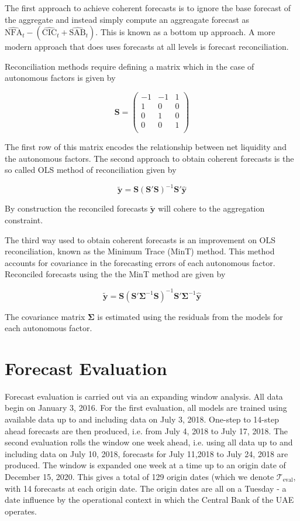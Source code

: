 \documentclass{article}
\begin{document}
The first approach to achieve coherent forecasts is to ignore the base forecast of the aggregate and instead simply compute an aggreagate forecast as 
$\hat{\textrm{NFA}}_t-(\hat{\textrm{CIC}}_t+\hat{\textrm{SAB}}_t)$. This is known as a bottom up approach. A more modern approach that does uses forecasts at all levels is forecast reconciliation.

Reconciliation methods require defining a matrix which in the case of autonomous factors is given by

\[
\mathbf{S}=\begin{pmatrix} -1 & -1 & 1\\
1 & 0 & 0\\
0 & 1 & 0\\
0 & 0 & 1\\
\end{pmatrix}
\]

The first row of this matrix encodes the relationship between net liquidity and the autonomous factors. The second approach to obtain coherent forecasts is the so called OLS method of reconciliation \citep{HynEtAl2011} given by

\[
\tilde{\mathbf{y}}=\mathbf{S}\left(\mathbf{S}'\mathbf{S}\right)^{-1}\mathbf{S}'\hat{\mathbf{y}}
\]

By construction the reconciled forecasts $\tilde{\mathbf{y}}$ will cohere to the aggregation constraint.

The third way used to obtain coherent forecasts is an improvement on OLS reconciliation, known as the Minimum Trace (MinT) method\citep{WicEtAl2019}.  This method accounts for covariance in the forecasting errors of each autonomous factor. Reconciled forecasts using the the MinT method are given by

\[
\tilde{\mathbf{y}}=\mathbf{S}\left(\mathbf{S}'\boldsymbol{\Sigma}^{-1}\mathbf{S}\right)^{-1}\mathbf{S}'\boldsymbol{\Sigma}^{-1}\hat{\mathbf{y}}
\]

The covariance matrix $\boldsymbol{\Sigma}$ is estimated using the residuals from the models for each autonomous factor.

\section{Forecast Evaluation}\label{sec:eval}

Forecast evaluation is carried out via an expanding window analysis. All data begin on January 3, 2016. For the first evaluation, all models are trained using available data up to and including data on July 3, 2018. One-step to 14-step ahead forecasts are then produced, i.e. from July 4, 2018 to July 17, 2018. The second evaluation rolls the window one week ahead, i.e. using all data up to and including data on July 10, 2018, forecasts for July 11,2018 to July 24, 2018 are produced. The window is expanded one week at a time up to an origin date of December 15, 2020. This gives a total of 129 origin dates (which we denote $\mathcal{T}_{\textrm{eval}}$, with 14 forecasts at each origin date. The origin dates are all on a Tuesday - a date influence by the operational context in which the Central Bank of the UAE operates.
\end{document}
